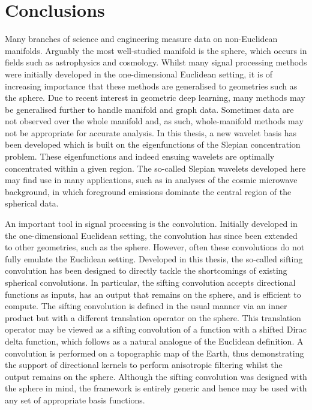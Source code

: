 \chapter{Conclusions}\label{sec:chapter6}

Many branches of science and engineering measure data on non-Euclidean manifolds.
Arguably the most well-studied manifold is the sphere, which occurs in fields such as astrophysics and cosmology.
Whilst many signal processing methods were initially developed in the one-dimensional Euclidean setting, it is of increasing importance that these methods are generalised to geometries such as the sphere.
Due to recent interest in geometric deep learning, many methods may be generalised further to handle manifold and graph data.
Sometimes data are not observed over the whole manifold and, as such, whole-manifold methods may not be appropriate for accurate analysis.
In this thesis, a new wavelet basis has been developed which is built on the eigenfunctions of the Slepian concentration problem.
These eigenfunctions and indeed ensuing wavelets are optimally concentrated within a given region.
The so-called Slepian wavelets developed here may find use in many applications, such as in analyses of the cosmic microwave background, in which foreground emissions dominate the central region of the spherical data.

An important tool in signal processing is the convolution.
Initially developed in the one-dimensional Euclidean setting, the convolution has since been extended to other geometries, such as the sphere.
However, often these convolutions do not fully emulate the Euclidean setting.
Developed in this thesis, the so-called sifting convolution has been designed to directly tackle the shortcomings of existing spherical convolutions.
In particular, the sifting convolution accepts directional functions as inputs, has an output that remains on the sphere, and is efficient to compute.
The sifting convolution is defined in the usual manner via an inner product but with a different translation operator on the sphere.
This translation operator may be viewed as a sifting convolution of a function with a shifted Dirac delta function, which follows as a natural analogue of the Euclidean definition.
A convolution is performed on a topographic map of the Earth, thus demonstrating the support of directional kernels to perform anisotropic filtering whilst the output remains on the sphere.
Although the sifting convolution was designed with the sphere in mind, the framework is entirely generic and hence may be used with any set of appropriate basis functions.

